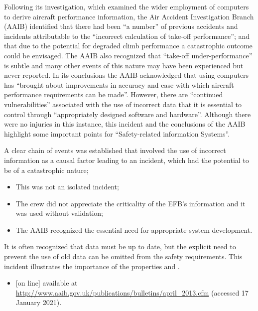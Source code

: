 Following its investigation, which examined the wider employment of computers to derive aircraft performance \gls{information}, the Air Accident Investigation Branch (AAIB) identified that there had been ``a number'' of previous accidents and incidents attributable to the ``incorrect calculation of take-off performance''; and that due to the potential for degraded climb performance a catastrophic outcome could be envisaged. The AAIB also recognized that ``take-off under-performance'' is subtle and many other events of this nature may have been experienced but never reported. In its conclusions the AAIB acknowledged that using computers has ``brought about improvements in \gls{accuracy} and ease with which aircraft performance requirements can be made''. However, there are ``continued vulnerabilities'' associated with the use of incorrect data that it is essential to control through ``appropriately designed software and hardware''. Although there were no injuries in this instance, this incident and the conclusions of the AAIB highlight some important points for ``Safety-related \Gls{information} Systems''.

A clear chain of events was established that involved the use of incorrect \gls{information} as a causal factor leading to an incident, which had the potential to be of a catastrophic nature;
\begin{itemize}
\item This was not an isolated incident;
\item The crew did not appreciate the \gls{criticality} of the EFB’s \gls{information} and it was used without \gls{validation}; 
\item The AAIB recognized the essential need for appropriate system development. 
\end{itemize}

It is often recognized that data must be up to date, but the explicit need to prevent the use of old data can be omitted from the safety requirements. This incident illustrates the importance of the properties  and . 

    
\begin{itemize}
\item \raggedright{ [on line] available at \href{http://www.aaib.gov.uk/publications/bulletins/april_2013.cfm}{http://www.aaib.gov.uk/publications/bulletins/april\_2013.cfm} (accessed 17 January 2021).}
\end{itemize}
    
